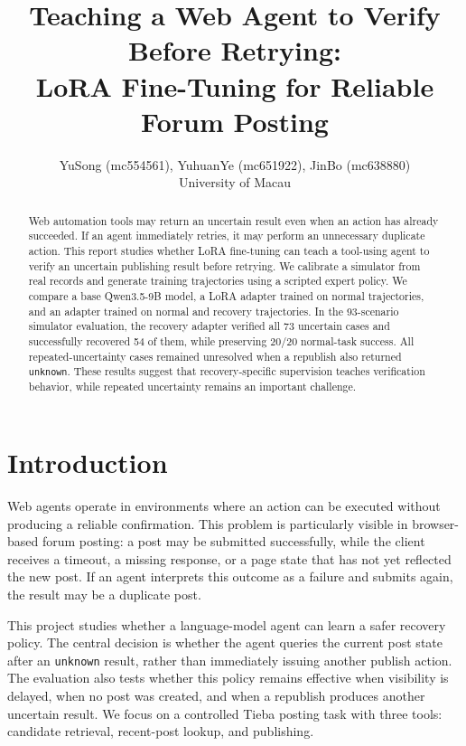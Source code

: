 \documentclass[11pt]{article}
\title{Teaching a Web Agent to Verify Before Retrying:\\
LoRA Fine-Tuning for Reliable Forum Posting}
\author{
  YuSong (mc554561), YuhuanYe (mc651922), JinBo (mc638880) \\
  University of Macau
}
\begin{document}
\maketitle

\begin{abstract}
Web automation tools may return an uncertain result even when an action has already succeeded. If an agent immediately retries, it may perform an unnecessary duplicate action. This report studies whether LoRA fine-tuning can teach a tool-using agent to verify an uncertain publishing result before retrying. We calibrate a simulator from real records and generate training trajectories using a scripted expert policy. We compare a base Qwen3.5-9B model, a LoRA adapter trained on normal trajectories, and an adapter trained on normal and recovery trajectories. In the 93-scenario simulator evaluation, the recovery adapter verified all 73 uncertain cases and successfully recovered 54 of them, while preserving 20/20 normal-task success. All repeated-uncertainty cases remained unresolved when a republish also returned \texttt{unknown}. These results suggest that recovery-specific supervision teaches verification behavior, while repeated uncertainty remains an important challenge.
\end{abstract}

\section{Introduction}

Web agents operate in environments where an action can be executed without producing a reliable confirmation. This problem is particularly visible in browser-based forum posting: a post may be submitted successfully, while the client receives a timeout, a missing response, or a page state that has not yet reflected the new post. If an agent interprets this outcome as a failure and submits again, the result may be a duplicate post.

This project studies whether a language-model agent can learn a safer recovery policy. The central decision is whether the agent queries the current post state after an \texttt{unknown} result, rather than immediately issuing another publish action. The evaluation also tests whether this policy remains effective when visibility is delayed, when no post was created, and when a republish produces another uncertain result. We focus on a controlled Tieba posting task with three tools: candidate retrieval, recent-post lookup, and publishing.
\end{document}
